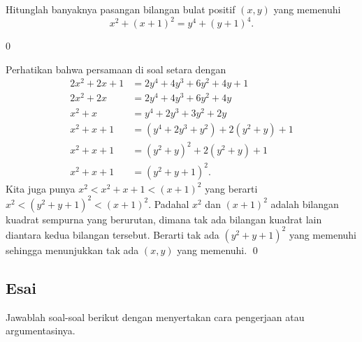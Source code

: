 \documentclass[12pt]{scrartcl}
\begin{document}
    \newpage
	\begin{soalbaru}
		Hitunglah banyaknya pasangan bilangan bulat positif $(x,y)$ yang memenuhi\\[-20pt] $$x^2+(x+1)^2=y^4+(y+1)^4.$$
		
		\begin{jawaban}
		0
		\end{jawaban}
		\begin{solusi}
		Perhatikan bahwa persamaan di soal setara dengan
		\begin{align*}
		2x^2+2x+1&=2y^4+4y^3+6y^2+4y+1\\
		2x^2+2x&=2y^4+4y^3+6y^2+4y\\
		x^2+x&=y^4+2y^3+3y^2+2y\\
		x^2+x+1&=(y^4+2y^3+y^2)+2(y^2+y)+1\\
		x^2+x+1&=(y^2+y)^2+2(y^2+y)+1\\
		x^2+x+1&=(y^2+y+1)^2.
		\end{align*}
		Kita juga punya $x^2 < x^2+x+1 < (x+1)^2$ yang berarti $x^2 < (y^2+y+1)^2 < (x+1)^2$. Padahal $x^2$ dan $(x+1)^2$ adalah bilangan kuadrat sempurna yang berurutan, dimana tak ada bilangan kuadrat lain diantara kedua bilangan tersebut. Berarti tak ada $(y^2+y+1)^2$ yang memenuhi sehingga menunjukkan tak ada $(x,y)$ yang memenuhi. \qed
		
		\end{solusi}
	\end{soalbaru}
	\newpage

\subsection{Esai}
Jawablah soal-soal berikut dengan menyertakan cara pengerjaan atau argumentasinya.
	
\end{document}
